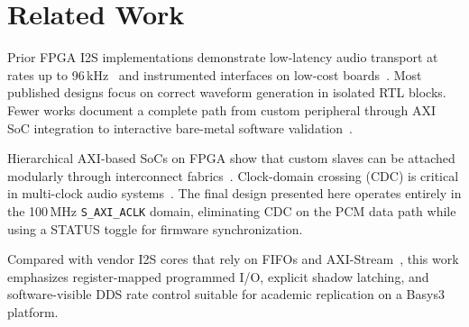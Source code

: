 \section{Related Work}
\label{sec:related}

Prior FPGA I2S implementations demonstrate low-latency audio transport at rates up to 96\,kHz~\cite{sang_i2s_codec_2020} and instrumented interfaces on low-cost boards~\cite{kaviani_i2s_fpga_2017}.
Most published designs focus on correct waveform generation in isolated RTL blocks.
Fewer works document a complete path from custom peripheral through AXI SoC integration to interactive bare-metal software validation~\cite{lafosse_embedded_2018,sklyarov_axi_peripheral_2014,crockett_zynq_book_2014}.

Hierarchical AXI-based SoCs on FPGA show that custom slaves can be attached modularly through interconnect fabrics~\cite{sklyarov_axi_peripheral_2014}.
Clock-domain crossing (CDC) is critical in multi-clock audio systems~\cite{ginosar_metastability_2011}.
The final design presented here operates entirely in the 100\,MHz \texttt{S\_AXI\_ACLK} domain, eliminating CDC on the PCM data path while using a STATUS toggle for firmware synchronization.

Compared with vendor I2S cores that rely on FIFOs and AXI-Stream~\cite{amd_pg308_i2s_logicore}, this work emphasizes register-mapped programmed I/O, explicit shadow latching, and software-visible DDS rate control suitable for academic replication on a Basys3 platform.
